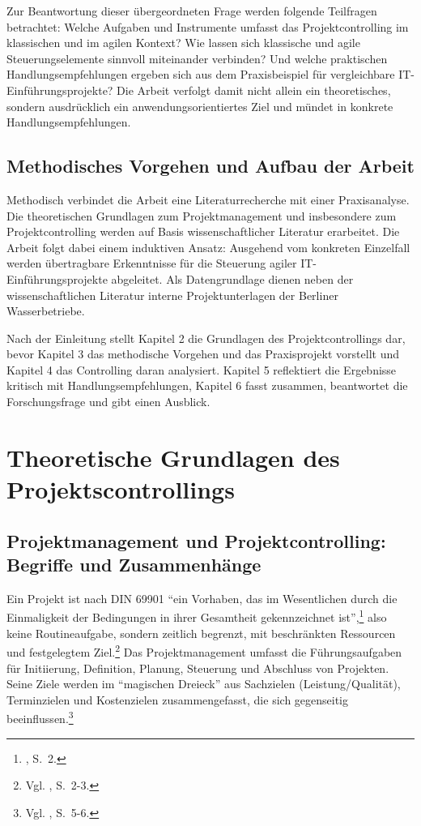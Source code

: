 \documentclass[
    12pt, 
    a4paper,
    ]{scrartcl} %
\begin{document}
Zur Beantwortung dieser übergeordneten Frage werden folgende Teilfragen betrachtet: Welche Aufgaben und Instrumente umfasst das Projektcontrolling im klassischen und im agilen Kontext? Wie lassen sich klassische und agile Steuerungselemente sinnvoll miteinander verbinden? Und welche praktischen Handlungsempfehlungen ergeben sich aus dem Praxisbeispiel für vergleichbare IT-Einführungsprojekte? Die Arbeit verfolgt damit nicht allein ein theoretisches, sondern ausdrücklich ein anwendungsorientiertes Ziel und mündet in konkrete Handlungsempfehlungen.

\subsection{Methodisches Vorgehen und Aufbau der Arbeit}
Methodisch verbindet die Arbeit eine Literaturrecherche mit einer Praxisanalyse. Die theoretischen Grundlagen zum Projektmanagement und insbesondere zum Projektcontrolling werden auf Basis wissenschaftlicher Literatur erarbeitet. Die Arbeit folgt dabei einem induktiven Ansatz: Ausgehend vom konkreten Einzelfall werden übertragbare Erkenntnisse für die Steuerung agiler IT-Einführungsprojekte abgeleitet. Als Datengrundlage dienen neben der wissenschaftlichen Literatur interne Projektunterlagen der Berliner Wasserbetriebe.

Nach der Einleitung stellt Kapitel 2 die Grundlagen des Projektcontrollings dar, bevor Kapitel 3 das methodische Vorgehen und das Praxisprojekt vorstellt und Kapitel 4 das Controlling daran analysiert. Kapitel 5 reflektiert die Ergebnisse kritisch mit Handlungsempfehlungen, Kapitel 6 fasst zusammen, beantwortet die Forschungsfrage und gibt einen Ausblick. 

\section{Theoretische Grundlagen des Projektscontrollings}

\subsection{Projektmanagement und Projektcontrolling: Begriffe und Zusammenhänge}
Ein Projekt ist nach DIN 69901 \enquote{ein Vorhaben, das im Wesentlichen durch die Einmaligkeit der Bedingungen in ihrer Gesamtheit gekennzeichnet ist},\footnote{\cite{Feidler_ControllingVonProjekten}, S.~2.} also keine Routineaufgabe, sondern zeitlich begrenzt, mit beschränkten Ressourcen und festgelegtem Ziel.\footnote{Vgl. \cite{Feidler_ControllingVonProjekten}, S.~2-3.} Das Projektmanagement umfasst die Führungsaufgaben für Initiierung, Definition, Planung, Steuerung und Abschluss von Projekten. Seine Ziele werden im \enquote{magischen Dreieck} aus Sachzielen (Leistung/Qualität), Terminzielen und Kostenzielen zusammengefasst, die sich gegenseitig beeinflussen.\footnote{Vgl. \cite{Feidler_ControllingVonProjekten}, S.~5-6.}
\end{document}
